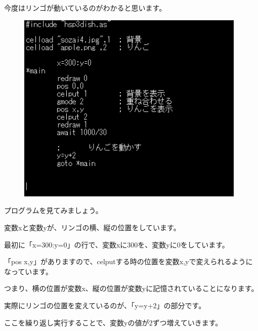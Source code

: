 今度はリンゴが動いているのがわかると思います。


\begin{figure}[H]
    \begin{center}
      \includegraphics[keepaspectratio,width=10.954cm,height=9.213cm]{text04-img/text04-img020.png}
    \end{center}
    \label{fig:prog_menu}
\end{figure}


プログラムを見てみましょう。

変数xと変数yが、リンゴの横、縦の位置をしています。

最初に「x=300:y=0」の行で、変数xに300を、変数yに0をしています。



\begin{description}
    \item {}
    \item {}
    \item {}
\end{description}

「pos x,y」がありますので、celputする時の位置を変数x,yで変えられるようになっています。

つまり、横の位置が変数x、縦の位置が変数yに記憶されていることになります。

実際にリンゴの位置を変えているのが、「y=y+2」の部分です。

ここを繰り返し実行することで、変数yの値が2ずつ増えていきます。


